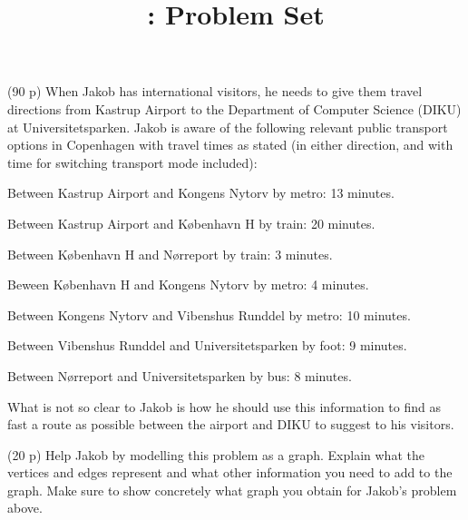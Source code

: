 \documentclass{jn-pset}
\author{\courseinstructor}
\title{\coursenameshort: Problem Set \psetno}
\begin{document}
\maketitle





 

\begin{problem}%
  \label{problem:shortest-path}%
  (90 p)
  When Jakob has international visitors, he needs to give them travel
  directions from Kastrup Airport to the
  Department of Computer Science (DIKU) at Universitetsparken.  Jakob
  is aware of the following relevant public transport options in
  Copenhagen with travel times as stated
  (in either direction, and with time for switching transport mode included):
  \begin{compactitem}
  \item
    Between Kastrup Airport and Kongens Nytorv by metro: 13 minutes.
    
  \item
    Between Kastrup Airport and København H by train: 20 minutes.
    
  \item
    Between København H and Nørreport by train: 3 minutes.
    
  \item
    Beween København H and Kongens Nytorv by metro: 4 minutes.
    
  \item
    Between Kongens Nytorv and Vibenshus Runddel by metro: 10 minutes.

  \item
    Between Vibenshus Runddel and Universitetsparken by foot: 9 minutes.
    
  \item
    Between Nørreport and Universitetsparken by bus: 8 minutes.

  \end{compactitem}
%
  What is not so clear to Jakob is how he should use this information
  to find
  as fast a route as possible
  between the airport and DIKU to suggest to his
  visitors.
  
  \begin{subproblem}
    {(20 p)}
    {\ignorespaces}
    Help Jakob by modelling this problem as a graph.
    Explain what the vertices and edges represent and what other
    information you need to add to the graph.
    Make sure to show concretely what graph you obtain
    for Jakob's problem above.
  \end{subproblem}



\end{problem}
\end{document}
